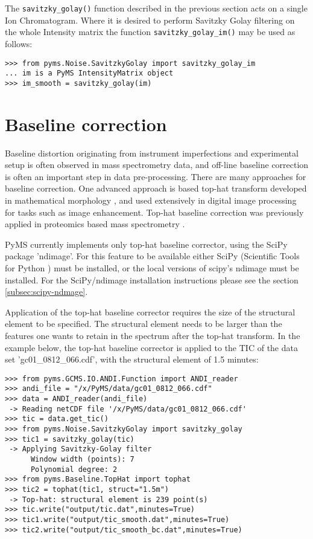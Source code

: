 The {\tt savitzky\_golay()} function described in the previous section
acts on a single Ion Chromatogram. Where it is desired to perform
Savitzky Golay filtering on the whole Intensity matrix the function
{\tt savitzky\_golay\_im()} may be used as follows:

\begin{verbatim}
>>> from pyms.Noise.SavitzkyGolay import savitzky_golay_im
... im is a PyMS IntensityMatrix object
>>> im_smooth = savitzky_golay(im)
\end{verbatim}



\section{Baseline correction}

Baseline distortion originating from instrument imperfections and
experimental setup is often observed in mass spectrometry data,
and off-line baseline correction is often an important step in
data pre-processing. There are many approaches for baseline
correction. One advanced approach is based top-hat transform
developed in mathematical morphology \cite{serra83}, and used
extensively in digital image processing for tasks such as image
enhancement. Top-hat baseline correction was previously applied
in proteomics based mass spectrometry \cite{sauve04}.

PyMS currently implements only top-hat baseline corrector, using
the SciPy package 'ndimage'. For this feature to be available either
SciPy (Scientific Tools for Python \cite{scipy}) must be installed,
or the local versions of scipy's ndimage must be installed. For
the SciPy/ndimage installation instructions please see the section
\ref{subsec:scipy-ndmage}.

Application of the top-hat baseline corrector requires the size
of the structural element to be specified. The structural element
needs to be larger than the features one wants to retain in the
spectrum after the top-hat transform. In the example below, the
top-hat baseline corrector is applied to the TIC of the data set
'gc01\_0812\_066.cdf', with the structural element of 1.5 minutes:

\begin{verbatim}
>>> from pyms.GCMS.IO.ANDI.Function import ANDI_reader
>>> andi_file = "/x/PyMS/data/gc01_0812_066.cdf"
>>> data = ANDI_reader(andi_file)
 -> Reading netCDF file '/x/PyMS/data/gc01_0812_066.cdf'
>>> tic = data.get_tic()
>>> from pyms.Noise.SavitzkyGolay import savitzky_golay
>>> tic1 = savitzky_golay(tic)
 -> Applying Savitzky-Golay filter
      Window width (points): 7
      Polynomial degree: 2
>>> from pyms.Baseline.TopHat import tophat
>>> tic2 = tophat(tic1, struct="1.5m")
 -> Top-hat: structural element is 239 point(s)
>>> tic.write("output/tic.dat",minutes=True)
>>> tic1.write("output/tic_smooth.dat",minutes=True)
>>> tic2.write("output/tic_smooth_bc.dat",minutes=True)
\end{verbatim}

